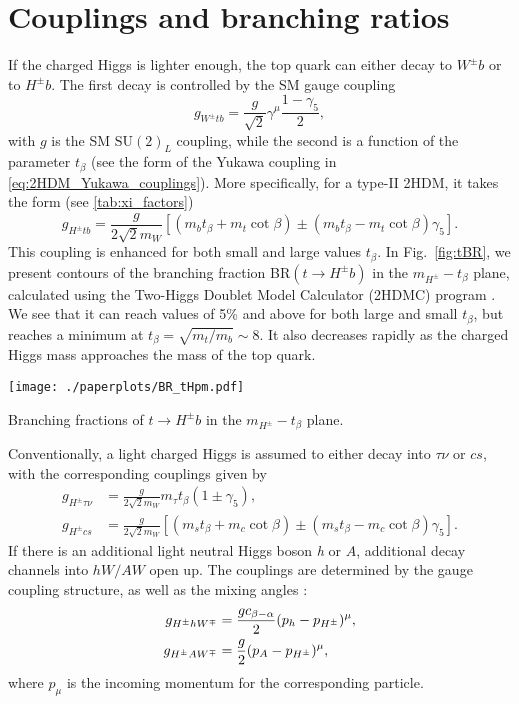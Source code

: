 \section{Couplings and branching ratios} \label{sec:motivation}

If the charged Higgs is lighter enough, the top quark can either decay to $W^\pm b$ or to $H^{\pm}b$. The first decay is controlled by the SM gauge coupling
\begin{equation}
g_{W^{\pm} tb} = \frac{g}{\sqrt{2}} \gamma^\mu \frac{1-\gamma_5}{2}, 
\end{equation}
with $g$ is the SM $\text{SU}(2)_L$ coupling, while the second is a function of the parameter $t_{\beta}$ (see the form of the Yukawa coupling in \eqref{eq:2HDM_Yukawa_couplings}). More specifically, for a type-II 2HDM, it takes the form (see \autoref{tab:xi_factors}) 
\begin{equation}
g_{H^{\pm} tb} = \frac{g}{2 \sqrt{2} m_W} \left[ (m_b t_{\beta} + m_t \cot \beta ) \pm (m_b t_{\beta} - m_t \cot \beta ) \gamma_5 \right].
\end{equation}
This coupling is enhanced for both small and large values $t_{\beta}$. In Fig.~\ref{fig:tBR}, we present contours of the branching fraction BR$(t \rightarrow H^{\pm} b)$ in the $m_{H^{\pm}}-t_{\beta}$ plane, calculated using the Two-Higgs Doublet Model Calculator (2HDMC) program \cite{Eriksson:2009ws}. We see that it can reach values of 5\% and above for both large and small $t_{\beta}$, but reaches a minimum at $t_{\beta} = \sqrt{m_t/m_b}\sim 8 $. It also decreases rapidly as the charged Higgs mass approaches the mass of the top quark.
\begin{marginfigure}
\centering
	\texttt{[image: ./paperplots/BR\_tHpm.pdf]}
\caption{Branching fractions of $t\rightarrow H^{\pm}b$ in the $m_{H^{\pm}}-t_{\beta}$ plane.}
\label{fig:tBR}
\end{marginfigure}

Conventionally, a light charged Higgs is assumed to either decay into $\tau\nu$ or $cs$, with the corresponding couplings given by
\begin{align*}
g_{H^{\pm} \tau\nu} &= \frac{g}{2 \sqrt{2} m_W} m_\tau t_{\beta}(1\pm \gamma_5 ), \\
g_{H^{\pm} cs} &= \frac{g}{2 \sqrt{2} m_W} \left[ (m_s t_{\beta} + m_c \cot \beta ) \pm (m_s t_{\beta} - m_c \cot \beta ) \gamma_5 \right].
 \end{align*}
If there is an additional light neutral Higgs boson \emph{h} or $A$, additional decay channels into $hW/AW$ open up. The couplings are determined by the gauge coupling structure, as well as the mixing angles \cite{Gunion:1989we}: 
\begin{align*}
  g_{H^{\pm} h W^{\mp}}&= \frac{gc_{\beta-\alpha}}{2}(p_{h}-p_{H^{\pm}})^\mu, \\
 g_{H^{\pm} A W^{\mp}}&= \frac{g}{2}(p_{A}-p_{H^{\pm}})^\mu, 
 \end{align*}
where $p_\mu$ is the incoming momentum for the corresponding particle. 

